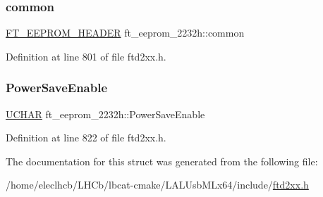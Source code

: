 \subsubsection{\texorpdfstring{common}{common}}
{\footnotesize\ttfamily \hyperlink{LALUsbMLx64_2include_2ftd2xx_8h_ad5a6f519cd67a403fd8742756462394e}{F\+T\+\_\+\+E\+E\+P\+R\+O\+M\+\_\+\+H\+E\+A\+D\+ER} ft\+\_\+eeprom\+\_\+2232h\+::common}



Definition at line 801 of file ftd2xx.\+h.

\mbox{\label{structft__eeprom__2232h_a411dc2831f568c59e7e7eed513254f94}} 
\subsubsection{\texorpdfstring{Power\+Save\+Enable}{PowerSaveEnable}}
{\footnotesize\ttfamily \hyperlink{CatCaloProto40MHz_2inc_2WinTypes_8h_a4f4bb67531a9bf6f0b9c6ad76aeba587}{U\+C\+H\+AR} ft\+\_\+eeprom\+\_\+2232h\+::\+Power\+Save\+Enable}



Definition at line 822 of file ftd2xx.\+h.



The documentation for this struct was generated from the following file\+:\begin{DoxyCompactItemize}
\item 
/home/eleclhcb/\+L\+H\+Cb/lbcat-\/cmake/\+L\+A\+L\+Usb\+M\+Lx64/include/\hyperlink{LALUsbMLx64_2include_2ftd2xx_8h}{ftd2xx.\+h}\end{DoxyCompactItemize}
